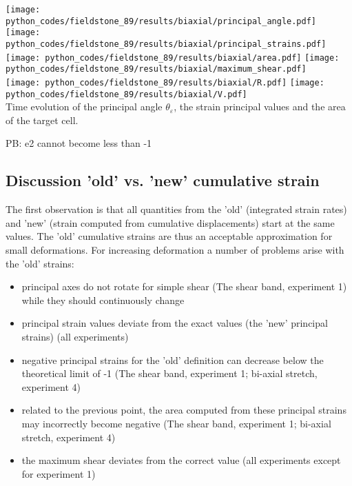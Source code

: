 \begin{center}
\texttt{[image: python\_codes/fieldstone\_89/results/biaxial/principal\_angle.pdf]}
\texttt{[image: python\_codes/fieldstone\_89/results/biaxial/principal\_strains.pdf]}\\
\texttt{[image: python\_codes/fieldstone\_89/results/biaxial/area.pdf]}
\texttt{[image: python\_codes/fieldstone\_89/results/biaxial/maximum\_shear.pdf]}\\
\texttt{[image: python\_codes/fieldstone\_89/results/biaxial/R.pdf]}
\texttt{[image: python\_codes/fieldstone\_89/results/biaxial/V.pdf]}\\
{\captionfont Time evolution of the principal angle $\theta_\varepsilon$, 
the strain principal values and the area of the target cell.}
\end{center}

PB: e2 cannot become less than -1 


\subsection*{Discussion 'old' vs. 'new' cumulative strain}

The first observation is that all quantities from the 'old' (integrated strain rates) and 'new' 
(strain computed from cumulative displacements) start at the same values. 
The 'old' cumulative strains are thus an acceptable approximation for small deformations. 
For increasing deformation a number of problems arise with the 'old' strains:

\begin{itemize}
\item principal axes do not rotate for simple shear (The shear band, experiment 1) while they should continuously change
\item principal strain values deviate from the exact values (the 'new' principal strains) (all experiments)
\item negative principal strains for the 'old' definition can decrease below the theoretical limit of -1 (The shear band, experiment 1; bi-axial stretch, experiment 4)
\item related to the previous point, the area computed from these principal strains may incorrectly become negative (The shear band, experiment 1;  bi-axial stretch, experiment 4)
\item the maximum shear deviates from the correct value (all experiments except for experiment 1)
\end{itemize}

